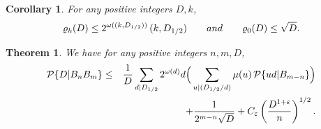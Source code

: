 \documentclass[10pt,a4paper]{amsart}
\newtheorem{theorem}{Theorem}
\newtheorem{corollary}{Corollary}
\def\P{{\mathcal P}}
\def \e{{\varepsilon}}
\def \m{{\mu}}
\def \o{{\omega}}
\def \qq{{\qquad}}
\begin{document}
\begin{corollary}\label{rokest} For any positive integers  $D,k$,   
$$\varrho_k(D)\le 2^{\o ((k, D_{1/2}))}\, (k, D_{1/2})
 \qq
  {\rm and}\qq
\varrho_0(D)\le  
\sqrt D.
$$   
\end{corollary}  

\begin{theorem} \label{bnmbound} We have for any positive integers $n,m,D$,  
\begin{eqnarray*}   \P \{ D|B_nB_m \} 
 &\le &{1  \over D }\sum_{d| D_{1/2} } 2^{\o (d)}d
 \Big(\sum_{u|  (D_{1/2}/d )}\m(u)\, \P\{ud|B_{m-n}\}\Big)
\cr &  &   +{1\over 2^{  m-n }\sqrt D } +C_\e
\left({     D  ^{1 + \e}\over   n }\right)^{1/2 }. 
\end{eqnarray*} 
   \end{theorem}  
\end{document}
